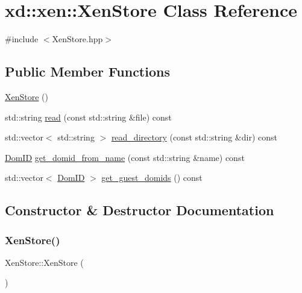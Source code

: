\hypertarget{classxd_1_1xen_1_1_xen_store}{}\section{xd\+:\+:xen\+:\+:Xen\+Store Class Reference}
\label{classxd_1_1xen_1_1_xen_store}


{\ttfamily \#include $<$Xen\+Store.\+hpp$>$}

\subsection*{Public Member Functions}
\begin{DoxyCompactItemize}
\item 
\mbox{\hyperlink{classxd_1_1xen_1_1_xen_store_a28893583fe81ab05b10dd841eb29dd05}{Xen\+Store}} ()
\item 
std\+::string \mbox{\hyperlink{classxd_1_1xen_1_1_xen_store_ab09ebbeb66a95ccd352ff2bda4a65562}{read}} (const std\+::string \&file) const
\item 
std\+::vector$<$ std\+::string $>$ \mbox{\hyperlink{classxd_1_1xen_1_1_xen_store_a8a3a5ae6e04b32e240c7d8d53ae071da}{read\+\_\+directory}} (const std\+::string \&dir) const
\item 
\mbox{\hyperlink{namespacexd_1_1xen_aaad6b5eb6f7e5ba76a4e4ca166ac8a08}{Dom\+ID}} \mbox{\hyperlink{classxd_1_1xen_1_1_xen_store_a68682bd23384e318b6ab15ed17e7a43c}{get\+\_\+domid\+\_\+from\+\_\+name}} (const std\+::string \&name) const
\item 
std\+::vector$<$ \mbox{\hyperlink{namespacexd_1_1xen_aaad6b5eb6f7e5ba76a4e4ca166ac8a08}{Dom\+ID}} $>$ \mbox{\hyperlink{classxd_1_1xen_1_1_xen_store_ac3a0e70e284c8f66d4e0cc3e70d88122}{get\+\_\+guest\+\_\+domids}} () const
\end{DoxyCompactItemize}


\subsection{Constructor \& Destructor Documentation}
\mbox{\label{classxd_1_1xen_1_1_xen_store_a28893583fe81ab05b10dd841eb29dd05}} 
\subsubsection{\texorpdfstring{Xen\+Store()}{XenStore()}}
{\footnotesize\ttfamily Xen\+Store\+::\+Xen\+Store (\begin{DoxyParamCaption}{ }\end{DoxyParamCaption})}



